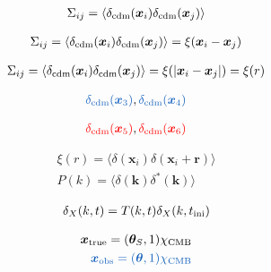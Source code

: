 \documentclass[a4paper, 11pt]{article}
\def\ba{\begin{eqnarray}}
\def\ea{\end{eqnarray}}
\newcommand{\red}[1]{{\color{red}#1}}
\newcommand{\blue}[1]{{\color{denim}#1}}
\begin{document}
\ba
\Sigma_{ij} = \langle \delta_{\rm cdm}(\bm{x}_{i}) \delta_{\rm cdm}(\bm{x}_{j}) \rangle
\ea


\ba
\Sigma_{ij} = \langle \delta_{\rm cdm}(\bm{x}_{i}) \delta_{\rm cdm}(\bm{x}_{j}) \rangle = \xi( \bm{x}_{i}-\bm{x}_{j}) 
\ea

\ba
\Sigma_{ij} = \langle \delta_{\rm cdm}(\bm{x}_{i}) \delta_{\rm cdm}(\bm{x}_{j}) \rangle =  \xi( |\bm{x}_{i}-\bm{x}_{j} |) =  \xi(r)
\ea

\ba
\blue{\delta_{\rm cdm}(\bm{x}_{3})},  \blue{\delta_{\rm cdm}(\bm{x}_{4})}
\ea

\ba
\red{\delta_{\rm cdm}(\bm{x}_{5})},  \red{\delta_{\rm cdm}(\bm{x}_{6})}
\ea


\ba
 \xi(r) = \langle \delta(\bm{x}_{i}) \delta(\bm{x}_{i} + \bm{r})  \rangle \\
P(k)  = \langle \delta(\bm{k}) \delta^{*}(\bm{k})  \rangle 
\ea

\ba
\delta_{X} (k, t) = T(k, t) \delta_{X} (k, t_{\rm ini})
\ea

\ba
{\bm x}_{\rm true} = ({\bm \theta_{S}}, 1) \chi_{\rm CMB} \\
\blue{{\bm x}_{\rm obs} = ({\bm \theta}, 1) \chi_{\rm CMB}}
\ea
\end{document}
